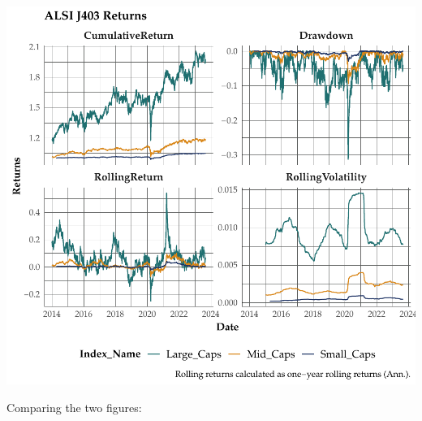 \documentclass[11pt,preprint, authoryear]{elsarticle}
\numberwithin{equation}{section}
\numberwithin{figure}{section}
\numberwithin{table}{section}
\begin{document}
\includegraphics{Question-3_files/figure-latex/403roll-ret-1.pdf}

Comparing the two figures:
\end{document}
